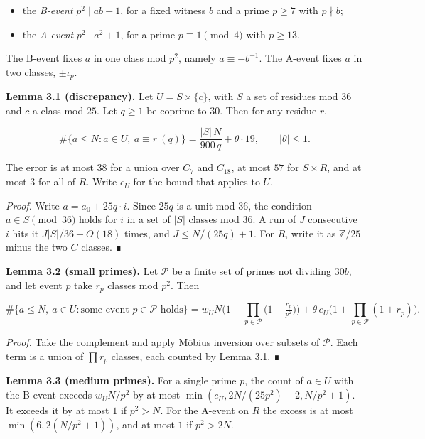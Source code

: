 \documentclass[
  11pt,
]{article}
\providecommand{\tightlist}{%
  \setlength{\itemsep}{0pt}\setlength{\parskip}{0pt}}
\begin{document}
\begin{itemize}
\tightlist
\item
  the \emph{B-event} \(p^2 \mid ab + 1\), for a fixed witness \(b\) and
  a prime \(p \ge 7\) with \(p \nmid b\);
\item
  the \emph{A-event} \(p^2 \mid a^2 + 1\), for a prime
  \(p \equiv 1 \pmod{4}\) with \(p \ge 13\).
\end{itemize}

The B-event fixes \(a\) in one class mod \(p^2\), namely
\(a \equiv -b^{-1}\). The A-event fixes \(a\) in two classes,
\(\pm\iota_p\).

\textbf{Lemma 3.1 (discrepancy).} Let \(U = S \times \{c\}\), with \(S\)
a set of residues mod \(36\) and \(c\) a class mod \(25\). Let
\(q \ge 1\) be coprime to \(30\). Then for any residue \(r\),

\[\#\{a \le N : a \in U,\ a \equiv r \ (q)\} = \frac{|S|\,N}{900\,q} + \theta \cdot 19, \qquad |\theta| \le 1.\]

The error is at most \(38\) for a union over \(C_7\) and \(C_{18}\), at
most \(57\) for \(S \times R\), and at most \(3\) for all of \(R\).
Write \(e_U\) for the bound that applies to \(U\).

\emph{Proof.} Write \(a = a_0 + 25q\cdot i\). Since \(25q\) is a unit
mod \(36\), the condition \(a \in S \pmod{36}\) holds for \(i\) in a set
of \(|S|\) classes mod \(36\). A run of \(J\) consecutive \(i\) hits it
\(J|S|/36 + O(18)\) times, and \(J \le N/(25q) + 1\). For \(R\), write
it as \(\mathbb{Z}/25\) minus the two \(C\) classes. ∎

\textbf{Lemma 3.2 (small primes).} Let \(\mathcal{P}\) be a finite set
of primes not dividing \(30b\), and let event \(p\) take \(r_p\) classes
mod \(p^2\). Then

\[\#\{a \le N,\ a\in U : \text{some event } p\in\mathcal P \text{ holds}\} = w_U N\Big(1-\prod_{p\in\mathcal P}\big(1-\tfrac{r_p}{p^2}\big)\Big) + \theta\, e_U \Big(1+\prod_{p\in\mathcal P}(1+r_p)\Big).\]

\emph{Proof.} Take the complement and apply Möbius inversion over
subsets of \(\mathcal{P}\). Each term is a union of \(\prod r_p\)
classes, each counted by Lemma 3.1. ∎

\textbf{Lemma 3.3 (medium primes).} For a single prime \(p\), the count
of \(a \in U\) with the B-event exceeds \(w_U N/p^2\) by at most
\(\min(e_U, 2N/(25p^2) + 2, N/p^2 + 1)\). It exceeds it by at most \(1\)
if \(p^2 > N\). For the A-event on \(R\) the excess is at most
\(\min(6, 2(N/p^2 + 1))\), and at most \(1\) if \(p^2 > 2N\).
\end{document}
